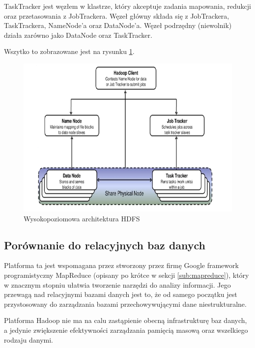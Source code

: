 \documentclass[10pt,twocolumn]{llncs}          %
\begin{document}
TaskTracker jest węzłem w klastrze, który akceptuje zadania mapowania, redukcji oraz przetasowania z JobTrackera. Węzeł główny składa się z JobTrackera, TaskTrackera, NameNode'a oraz DataNode'a. Węzeł podrzędny (niewolnik) działa zarówno jako DataNode oraz TaskTracker.

Wszytko to zobrazowane jest na rysunku \ref{fig:hdfs_hight_level_architecture}.

\begin{figure}
    \centerline{\includegraphics[scale=0.4]{obrazki/wysokopoziomowa_architektura_hadoop.png}}
    \caption{Wysokopoziomowa architektura HDFS}
    \label{fig:hdfs_hight_level_architecture}       %
\end{figure}


\subsection{Porównanie do relacyjnych baz danych}
\label{ssub:porownanie_z_relacyjnymi}
Platforma ta jest wspomagana przez stworzony przez firmę Google framework programistyczny MapReduce (opisany po krótce w sekcji \ref{sub:mapreduce}), który w znacznym stopniu ułatwia tworzenie narzędzi do analizy informacji. Jego przewagą nad relacyjnymi bazami danych jest to, że od samego początku jest przystosowany do zarządzania bazami przechowywującymi dane niestrukturalne.

Platforma Hadoop nie ma na calu zastąpienie obecną infrastrukturę baz danych, a jedynie zwiększenie efektywności zarządzania pamięcią masową oraz wszelkiego rodzaju danymi.
\end{document}
